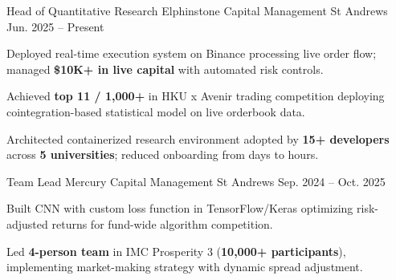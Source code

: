 \begin{cventries}
  \cventry
    {Head of Quantitative Research} %
    {Elphinstone Capital Management} %
    {St Andrews} %
    {Jun. 2025 -- Present} %
    {
      \begin{cvitems}
        \item {Deployed real-time execution system on Binance processing live order flow; managed \textbf{\$10K+ in live capital} with automated risk controls.}
        \item {Achieved \textbf{top 11 / 1,000+} in HKU x Avenir trading competition deploying cointegration-based statistical model on live orderbook data.}
        \item {Architected containerized research environment adopted by \textbf{15+ developers} across \textbf{5 universities}; reduced onboarding from days to hours.}
      \end{cvitems}
    }

  \cventry
    {Team Lead} %
    {Mercury Capital Management} %
    {St Andrews} %
    {Sep. 2024 -- Oct. 2025} %
    {
      \begin{cvitems}
        \item {Built CNN with custom loss function in TensorFlow/Keras optimizing risk-adjusted returns for fund-wide algorithm competition.}
        \item {Led \textbf{4-person team} in IMC Prosperity 3 (\textbf{10,000+ participants}), implementing market-making strategy with dynamic spread adjustment.}
      \end{cvitems}
    }

\end{cventries}
